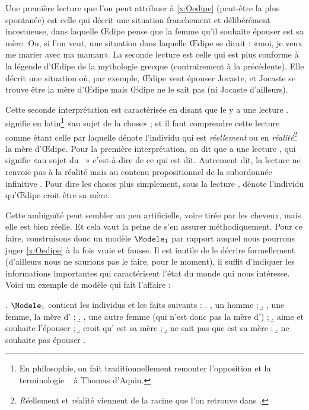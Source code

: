 Une première lecture que l'on peut attribuer à \ref{x:Oedipe} (peut-être la plus spontanée) est celle qui décrit une situation franchement et délibérément incestueuse, dans laquelle \OE dipe pense que la femme qu'il souhaite épouser est sa mère. Ou, si l'on veut, une situation dans laquelle \OE dipe se dirait : «moi, je veux me marier avec ma maman».
La seconde lecture est celle qui est plus conforme à la légende d'\OE dipe de la mythologie grecque (contrairement à la précédente). Elle décrit une situation où, par exemple, \OE dipe veut épouser Jocaste, et Jocaste se trouve être la mère d'\OE dipe mais \OE dipe ne le sait pas (ni Jocaste d'ailleurs). 

\label{p.re/dicto}%
Cette seconde interprétation est caractérisée en disant que le {\GN}  y a une lecture .  signifie en latin\footnote{En philosophie, on fait traditionnellement remonter l'opposition et la terminologie  \vs\  à Thomas d'Aquin.} «au sujet de la chose» ; et il faut comprendre cette lecture comme étant celle par laquelle  dénote l'individu qui est \emph{réellement} ou en \emph{réalité}\footnote{\emph{Ré}ellement et \emph{ré}alité viennent de la racine  que l'on retrouve dans .} la mère d'\OE dipe.  Pour la première interprétation, on dit que  a une lecture , qui signifie «au sujet du ~» c'est-à-dire de ce qui est dit.  Autrement dit, la lecture  ne renvoie pas à la réalité mais au contenu propositionnel de la subordonnée infinitive . Pour dire les choses plus simplement, sous la lecture ,  dénote l'individu qu'\OE dipe croit être sa mère.

Cette ambiguïté peut sembler un peu artificielle, voire tirée par les cheveux, mais elle est bien réelle. Et cela vaut la peine de s'en assurer méthodiquement.  Pour ce faire, construisons donc un modèle $\Modele_1$ par rapport auquel nous pourrons juger \ref{x:Oedipe} à la fois vraie et fausse.  
Il est inutile de le décrire formellement (d'ailleurs nous ne saurions pas le faire, pour le moment), il suffit d'indiquer les informations importantes qui caractérisent l'état du monde qui nous intéresse. 
Voici un exemple de modèle qui fait l'affaire :

\ex. $\Modele_1$ contient les individus et les faits suivants :
\a. , un homme ;
\b. , une femme, la mère d' ;
\b. , une autre femme (qui n'est donc pas la mère d') ;
\b.  aime  et souhaite l'épouser ;
\b.  croit qu' est sa mère ;
\b.  ne sait pas que  est sa mère ;
\b.  ne souhaite pas épouser .

